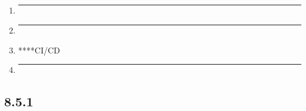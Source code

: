 \subsection{}\label{section-63}

\begin{enumerate}
\def\labelenumi{\arabic{enumi}.}
\item
  \begin{center}\rule{0.5\linewidth}{0.5pt}\end{center}
\item
  \begin{center}\rule{0.5\linewidth}{0.5pt}\end{center}
\item
  ****CI/CD
\item
  \begin{center}\rule{0.5\linewidth}{0.5pt}\end{center}
\end{enumerate}

\subsection{8.5.1}\label{section-64}

\subsubsection{}\label{section-65}

